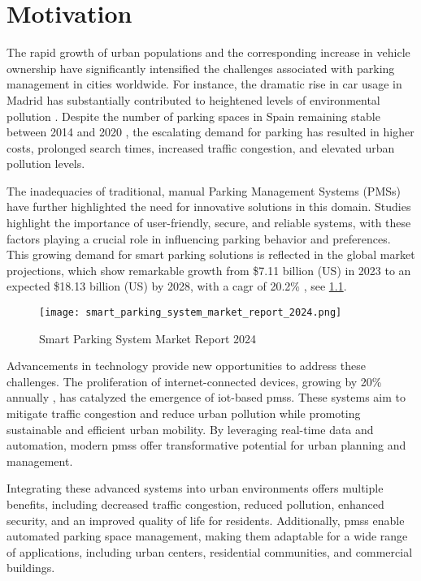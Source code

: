 \chapter{Motivation}\label{ch:motivation}

The rapid growth of urban populations and the corresponding increase in vehicle ownership have significantly intensified the challenges associated with parking management in cities worldwide. For instance, the dramatic rise in car usage in Madrid has substantially contributed to heightened levels of environmental pollution \autocite{environmental_impact_madrid_central}. Despite the number of parking spaces in Spain remaining stable between 2014 and 2020 \autocite{urban_mobility_trends}, the escalating demand for parking has resulted in higher costs, prolonged search times, increased traffic congestion, and elevated urban pollution levels.

The inadequacies of traditional, manual Parking Management Systems (PMSs) have further highlighted the need for innovative solutions in this domain. Studies highlight the importance of user-friendly, secure, and reliable systems, with these factors playing a crucial role in influencing parking behavior and preferences. This growing demand for smart parking solutions is reflected in the global market projections, which show remarkable growth from \$7.11 billion (US) in 2023 to an expected \$18.13 billion (US) by 2028, with a \gls{cagr} of 20.2\% \autocite{smart_parking_system_market_report_2024}, see \cref{fig:smart_parking_system_market_report_2024}.

\begin{figure}
	\texttt{[image: smart\_parking\_system\_market\_report\_2024.png]}
	\caption{Smart Parking System Market Report 2024 \autocite{smart_parking_system_market_report_2024}}\label{fig:smart_parking_system_market_report_2024}
\end{figure}

Advancements in technology provide new opportunities to address these challenges. The proliferation of internet-connected devices, growing by 20\% annually \autocite{iot_growth}, has catalyzed the emergence of \gls{iot}-based \glspl{pms}. These systems aim to mitigate traffic congestion and reduce urban pollution while promoting sustainable and efficient urban mobility. By leveraging real-time data and automation, modern \glspl{pms} offer transformative potential for urban planning and management.

Integrating these advanced systems into urban environments offers multiple benefits, including decreased traffic congestion, reduced pollution, enhanced security, and an improved quality of life for residents. Additionally, \glspl{pms} enable automated parking space management, making them adaptable for a wide range of applications, including urban centers, residential communities, and commercial buildings.

